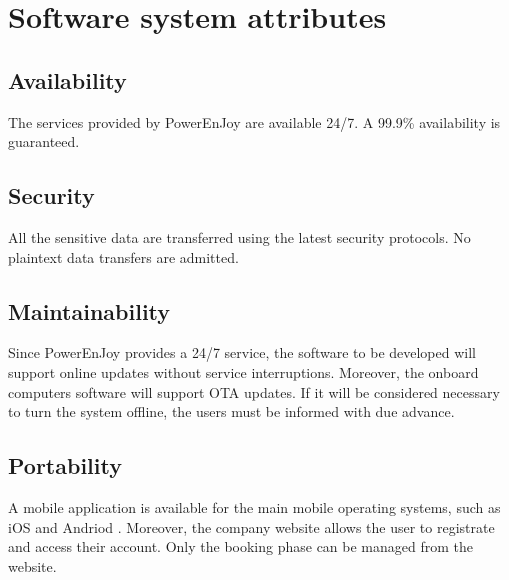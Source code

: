 \section{Software system attributes}

\subsection{Availability}
The services provided by PowerEnJoy are available 24/7. A 99.9\% availability is guaranteed.

\subsection{Security}
All the sensitive data are transferred using the latest security protocols. No plaintext data transfers are admitted.

\subsection{Maintainability}
Since PowerEnJoy provides a 24/7 service, the software to be developed will support online updates without service interruptions. Moreover, the onboard computers software will support OTA updates. If it will be considered necessary to turn the system offline, the users must be informed with due advance.

\subsection{Portability}
A mobile application is available for the main mobile operating systems, such as iOS \cite{ios} and Andriod \cite{android}. Moreover, the company website allows the user to registrate and access their account. Only the booking phase can be managed from the website.

